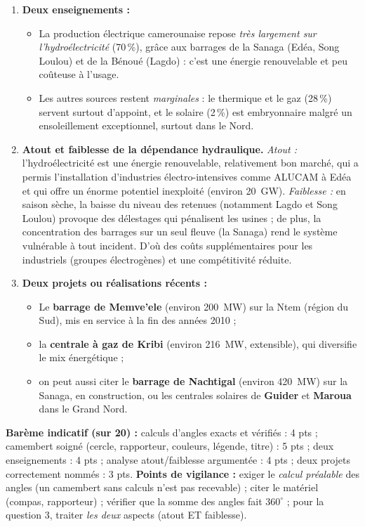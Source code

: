 \documentclass[11pt]{article}
\begin{document}
\begin{corrige}
\begin{enumerate}
\item \textbf{Deux enseignements :}
\begin{itemize}
\item La production électrique camerounaise repose \emph{très largement sur l'hydroélectricité} (70\,\%), grâce aux barrages de la Sanaga (Edéa, Song Loulou) et de la Bénoué (Lagdo) : c'est une énergie renouvelable et peu coûteuse à l'usage.
\item Les autres sources restent \emph{marginales} : le thermique et le gaz (28\,\%) servent surtout d'appoint, et le solaire (2\,\%) est embryonnaire malgré un ensoleillement exceptionnel, surtout dans le Nord.
\end{itemize}

\item \textbf{Atout et faiblesse de la dépendance hydraulique.} \emph{Atout :} l'hydroélectricité est une énergie renouvelable, relativement bon marché, qui a permis l'installation d'industries électro-intensives comme ALUCAM à Edéa et qui offre un énorme potentiel inexploité (environ \SI{20}{GW}). \emph{Faiblesse :} en saison sèche, la baisse du niveau des retenues (notamment Lagdo et Song Loulou) provoque des délestages qui pénalisent les usines ; de plus, la concentration des barrages sur un seul fleuve (la Sanaga) rend le système vulnérable à tout incident. D'où des coûts supplémentaires pour les industriels (groupes électrogènes) et une compétitivité réduite.

\item \textbf{Deux projets ou réalisations récents :}
\begin{itemize}
\item Le \textbf{barrage de Memve'ele} (environ \SI{200}{MW}) sur la Ntem (région du Sud), mis en service à la fin des années 2010 ;
\item la \textbf{centrale à gaz de Kribi} (environ \SI{216}{MW}, extensible), qui diversifie le mix énergétique ;
\item on peut aussi citer le \textbf{barrage de Nachtigal} (environ \SI{420}{MW}) sur la Sanaga, en construction, ou les centrales solaires de \textbf{Guider} et \textbf{Maroua} dans le Grand Nord.
\end{itemize}
\end{enumerate}
\textbf{Barème indicatif (sur 20) :} calculs d'angles exacts et vérifiés : 4 pts ; camembert soigné (cercle, rapporteur, couleurs, légende, titre) : 5 pts ; deux enseignements : 4 pts ; analyse atout/faiblesse argumentée : 4 pts ; deux projets correctement nommés : 3 pts.
\textbf{Points de vigilance :} exiger le \emph{calcul préalable} des angles (un camembert sans calculs n'est pas recevable) ; citer le matériel (compas, rapporteur) ; vérifier que la somme des angles fait $360^{\circ}$ ; pour la question 3, traiter \emph{les deux} aspects (atout ET faiblesse).
\end{corrige}
\end{document}
